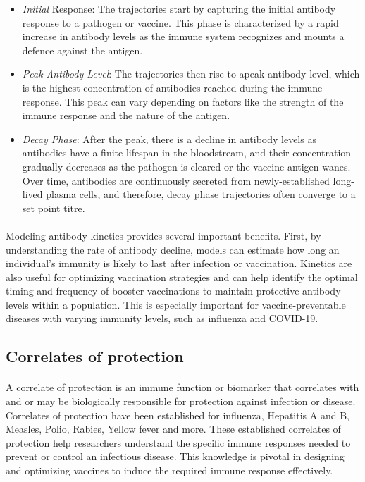 \begin{itemize}
\item \textit{Initial} Response: The trajectories start by capturing the initial antibody response to a pathogen or vaccine. This phase is characterized by a rapid increase in antibody levels as the immune system recognizes and mounts a defence against the antigen.

\item \textit{Peak Antibody Level}: The trajectories then rise to apeak antibody level, which is the highest concentration of antibodies reached during the immune response. This peak can vary depending on factors like the strength of the immune response and the nature of the antigen.

\item \textit{Decay Phase}: After the peak, there is a decline in antibody levels as antibodies have a finite lifespan in the bloodstream, and their concentration gradually decreases as the pathogen is cleared or the vaccine antigen wanes. Over time, antibodies are continuously secreted from newly-established long-lived plasma cells, and therefore, decay phase trajectories often converge to a set point titre.\cite{Srivastava2023-of}
\end{itemize}


\paragraph{}Modeling antibody kinetics provides several important benefits. First, by understanding the rate of antibody decline, models can estimate how long an individual's immunity is likely to last after infection or vaccination. Kinetics are also useful for optimizing vaccination strategies and can help identify the optimal timing and frequency of booster vaccinations to maintain protective antibody levels within a population. This is especially important for vaccine-preventable diseases with varying immunity levels, such as influenza and COVID-19.

\subsection{Correlates of protection}
\paragraph{} A correlate of protection is an immune function or biomarker that correlates with and or may be biologically responsible for protection against infection or disease. Correlates of protection have been established for influenza, Hepatitis A and B, Measles, Polio, Rabies, Yellow fever and more.\cite{Plotkin2022-pg} These established correlates of protection help researchers understand the specific immune responses needed to prevent or control an infectious disease. This knowledge is pivotal in designing and optimizing vaccines to induce the required immune response effectively.\cite{Immunology_undated-fs}

